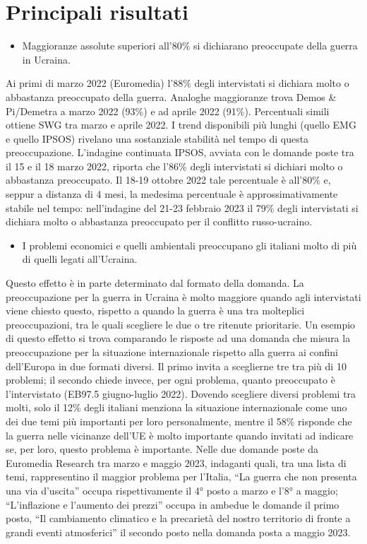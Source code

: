 \documentclass[
  openany]{book}
\providecommand{\tightlist}{%
  \setlength{\itemsep}{0pt}\setlength{\parskip}{0pt}}
\begin{document}
\hypertarget{principali-risultati}{%
\section{Principali risultati}\label{principali-risultati}}

\begin{itemize}
\tightlist
\item
  Maggioranze assolute superiori all'80\% si dichiarano preoccupate della guerra in Ucraina.
\end{itemize}

Ai primi di marzo 2022 (Euromedia) l'88\% degli intervistati si dichiara molto o abbastanza preoccupato della guerra. Analoghe maggioranze trova Demos \& Pi/Demetra a marzo 2022 (93\%) e ad aprile 2022 (91\%). Percentuali simili ottiene SWG tra marzo e aprile 2022. I trend disponibili più lunghi (quello EMG e quello IPSOS) rivelano una sostanziale stabilità nel tempo di questa preoccupazione. L'indagine continuata IPSOS, avviata con le domande poste tra il 15 e il 18 marzo 2022, riporta che l'86\% degli intervistati si dichiari molto o abbastanza preoccupato. Il 18-19 ottobre 2022 tale percentuale è all'80\% e, seppur a distanza di 4 mesi, la medesima percentuale è approssimativamente stabile nel tempo: nell'indagine del 21-23 febbraio 2023 il 79\% degli intervistati si dichiara molto o abbastanza preoccupato per il conflitto russo-ucraino.

\begin{itemize}
\tightlist
\item
  I problemi economici e quelli ambientali preoccupano gli italiani molto di più di quelli legati all'Ucraina.
\end{itemize}

Questo effetto è in parte determinato dal formato della domanda. La preoccupazione per la guerra in Ucraina è molto maggiore quando agli intervistati viene chiesto questo, rispetto a quando la guerra è una tra molteplici preoccupazioni, tra le quali scegliere le due o tre ritenute prioritarie. Un esempio di questo effetto si trova comparando le risposte ad una domanda che misura la preoccupazione per la situazione internazionale rispetto alla guerra ai confini dell'Europa in due formati diversi. Il primo invita a sceglierne tre tra più di 10 problemi; il secondo chiede invece, per ogni problema, quanto preoccupato è l'intervistato (EB97.5 giugno-luglio 2022). Dovendo scegliere diversi problemi tra molti, solo il 12\% degli italiani menziona la situazione internazionale come uno dei due temi più importanti per loro personalmente, mentre il 58\% risponde che la guerra nelle vicinanze dell'UE è molto importante quando invitati ad indicare se, per loro, questo problema è importante.
Nelle due domande poste da Euromedia Research tra marzo e maggio 2023, indaganti quali, tra una lista di temi, rappresentino il maggior problema per l'Italia, ``La guerra che non presenta una via d'uscita'' occupa rispettivamente il 4° posto a marzo e l'8° a maggio; ``L'inflazione e l'aumento dei prezzi'' occupa in ambedue le domande il primo posto, ``Il cambiamento climatico e la precarietà del nostro territorio di fronte a grandi eventi atmosferici'' il secondo posto nella domanda posta a maggio 2023.
\end{document}
